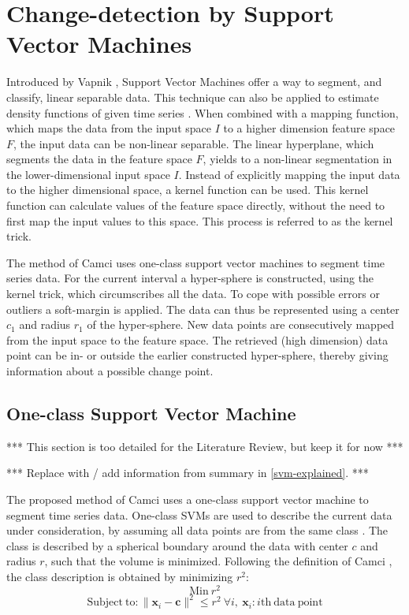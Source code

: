 \section{Change-detection by Support Vector Machines}\label{svm}

Introduced by Vapnik \cite{vapnik1998statistical, vapnik1999nature}, Support Vector Machines offer a way to segment, and classify, linear separable data.
This technique can also be applied to estimate density functions of given time series \cite{weston1999support}.
When combined with a mapping function, which maps the data from the input space $I$ to a higher dimension feature space $F$, the input data can be non-linear separable.
The linear hyperplane, which segments the data in the feature space $F$, yields to a non-linear segmentation in the lower-dimensional input space $I$.
Instead of explicitly mapping the input data to the higher dimensional space, a kernel function can be used.
This kernel function can calculate values of the feature space directly, without the need to first map the input values to this space.
This process is referred to as the kernel trick.

The method of Camci \cite{camci2010change} uses one-class support vector machines to segment time series data.
For the current interval a hyper-sphere is constructed, using the kernel trick, which circumscribes all the data.
To cope with possible errors or outliers a soft-margin is applied.
The data can thus be represented using a center $c_1$ and radius $r_1$ of the hyper-sphere.
New data points are consecutively mapped from the input space to the feature space.
The retrieved (high dimension) data point can be in- or outside the earlier constructed hyper-sphere, thereby giving information about a possible change point.



\subsection{One-class Support Vector Machine}
*** This section is too detailed for the Literature Review, but keep it for now ***


*** Replace with / add information from summary in \ref{svm-explained}. ***

The proposed method of Camci \cite{camci2010change} uses a one-class support vector machine to segment time series data.
One-class SVMs are used to describe the current data under consideration, by assuming all data points are from the same class \cite{tax2001one}.
The class is described by a spherical boundary around the data with center $c$ and radius $r$, such that the volume is minimized.
Following the definition of Camci \cite{camci2010change}, the class description is obtained by minimizing $r^2$:
\begin{equation}
  \mathrm{Min}\ r^2
\end{equation}
\begin{equation}
  \mathrm{Subject\ to} : \|\mathbf{x}_i - \mathbf{c}\|^2 \le r^2\ \forall i,\ \mathbf{x}_i : i \mathrm{th\ data\ point}
\end{equation}


